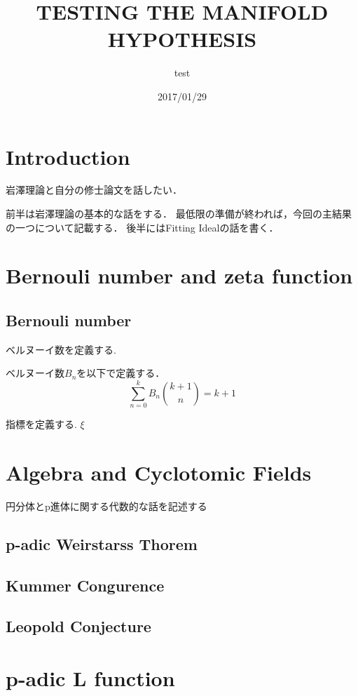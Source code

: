 \documentclass{ujarticle}
\title{TESTING THE MANIFOLD HYPOTHESIS}
\author{test}
\date{2017/01/29}
\begin{document}
\section{Introduction}
\label{sec:Introduction}
岩澤理論と自分の修士論文を話したい．

前半は岩澤理論の基本的な話をする．
最低限の準備が終われば，今回の主結果の一つについて記載する．
後半にはFitting Idealの話を書く．
\section{Bernouli number and zeta function}
\label{sec:Bernouli number and zeta function}
\subsection{Bernouli number}
\label{sub:Bernouli number}
ベルヌーイ数を定義する.
\begin{dfn}
 ベルヌーイ数$B_n$を以下で定義する．
 \begin{equation*}
  \sum_{n=0}^k B_n \binom{k+1}{n}=k+1
 \end{equation*}
\end{dfn}

指標を定義する.
$\xi$

\section{Algebra and Cyclotomic Fields}
\label{sec:Algebra and Cyclotomic Fields}
円分体とp進体に関する代数的な話を記述する

\subsection{p-adic Weirstarss Thorem}
\label{sub:p-adic Weirstarss Theorem}

\subsection{Kummer Congurence}
\label{sub:Kummer Congurence}

\subsection{Leopold Conjecture}
\label{sub:Leopold Conjecture}



\section{p-adic L function}
\label{sec:p-adic L function}
\end{document}
